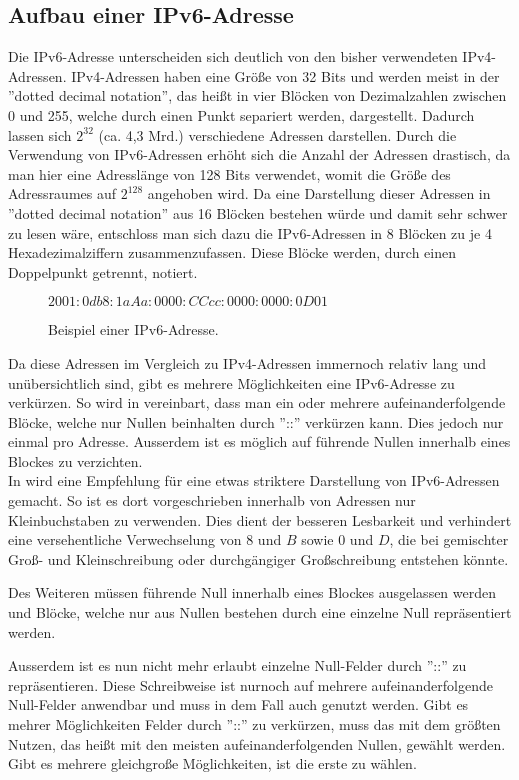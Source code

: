 \documentclass[a4paper, 12pt]{scrartcl}
\begin{document}
\subsection{Aufbau einer IPv6-Adresse}
Die IPv6-Adresse unterscheiden sich deutlich von den bisher verwendeten IPv4-Adressen. IPv4-Adressen haben eine Größe von 32 Bits und werden meist in der ''dotted decimal notation'', das heißt in vier Blöcken von Dezimalzahlen zwischen 0 und 255, welche durch einen Punkt separiert werden, dargestellt. Dadurch lassen sich $2^{32}$ (ca. 4,3 Mrd.) verschiedene Adressen darstellen.
Durch die Verwendung von IPv6-Adressen erhöht sich die Anzahl der Adressen drastisch, da man hier eine Adresslänge von 128 Bits verwendet, womit die Größe des Adressraumes auf $2^{128}$ angehoben wird. Da eine Darstellung dieser Adressen in ''dotted decimal notation'' aus 16 Blöcken bestehen würde und damit sehr schwer zu lesen wäre, entschloss man sich dazu die IPv6-Adressen in 8 Blöcken zu je 4 Hexadezimalziffern zusammenzufassen. Diese Blöcke werden, durch einen Doppelpunkt getrennt, notiert.


\begin{figure}[h]
	\centering
	$2001:0db8:1aAa:0000:CCcc:0000:0000:0D01$
	\caption{Beispiel einer IPv6-Adresse.}
\end{figure}


Da diese Adressen im Vergleich zu IPv4-Adressen immernoch relativ lang und unübersichtlich sind, gibt es mehrere Möglichkeiten eine IPv6-Adresse zu verkürzen.
So wird in \cite{rfc4291} vereinbart, dass man ein oder mehrere aufeinanderfolgende Blöcke, welche nur Nullen beinhalten durch ''::'' verkürzen kann. Dies jedoch nur einmal pro Adresse.
Ausserdem ist es möglich auf führende Nullen innerhalb eines Blockes zu verzichten. \\


In \cite{rfc5952} wird eine Empfehlung für eine etwas striktere Darstellung von IPv6-Adressen gemacht.
So ist es dort vorgeschrieben innerhalb von Adressen nur Kleinbuchstaben zu verwenden. Dies dient der besseren Lesbarkeit und verhindert eine versehentliche Verwechselung von $8$ und $B$ sowie $0$ und $D$, die bei gemischter Groß- und Kleinschreibung oder durchgängiger Großschreibung entstehen könnte.

Des Weiteren müssen führende Null innerhalb eines Blockes ausgelassen werden und Blöcke, welche nur aus Nullen bestehen durch eine einzelne Null repräsentiert werden.

Ausserdem ist es nun nicht mehr erlaubt einzelne Null-Felder durch ''::'' zu repräsentieren. Diese Schreibweise ist nurnoch auf mehrere aufeinanderfolgende Null-Felder anwendbar und muss in dem Fall auch genutzt werden. Gibt es mehrer Möglichkeiten Felder durch ''::'' zu verkürzen, muss das mit dem größten Nutzen, das heißt mit den meisten aufeinanderfolgenden Nullen, gewählt werden. Gibt es mehrere gleichgroße Möglichkeiten, ist die erste zu wählen.
\end{document}
